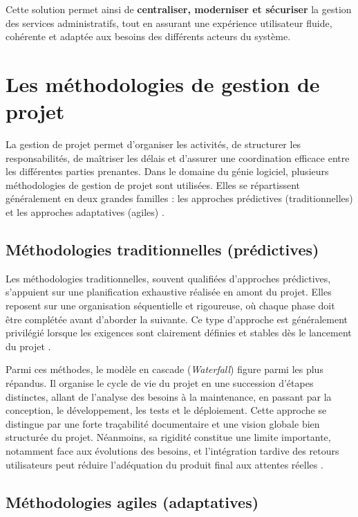 Cette solution permet ainsi de \textbf{centraliser, moderniser et sécuriser} la gestion des services administratifs, tout en assurant une expérience utilisateur fluide, cohérente et adaptée aux besoins des différents acteurs du système.


\section{Les méthodologies de gestion de projet}

La gestion de projet permet d’organiser les activités, de structurer les responsabilités, de maîtriser les délais et d’assurer une coordination efficace entre les différentes parties prenantes. Dans le domaine du génie logiciel, plusieurs méthodologies de gestion de projet sont utilisées. Elles se répartissent généralement en deux grandes familles : les approches prédictives (traditionnelles) et les approches adaptatives (agiles) \parencite{pmbok2017} .
 

\subsection{Méthodologies traditionnelles (prédictives)}

Les méthodologies traditionnelles, souvent qualifiées d’approches prédictives, s’appuient sur une planification exhaustive réalisée en amont du projet. Elles reposent sur une organisation séquentielle et rigoureuse, où chaque phase doit être complétée avant d’aborder la suivante. Ce type d’approche est généralement privilégié lorsque les exigences sont clairement définies et stables dès le lancement du projet \parencite{pressman2014}.

Parmi ces méthodes, le modèle en cascade (\textit{Waterfall}) figure parmi les plus répandus. Il organise le cycle de vie du projet en une succession d’étapes distinctes, allant de l’analyse des besoins à la maintenance, en passant par la conception, le développement, les tests et le déploiement. Cette approche se distingue par une forte traçabilité documentaire et une vision globale bien structurée du projet. Néanmoins, sa rigidité constitue une limite importante, notamment face aux évolutions des besoins, et l’intégration tardive des retours utilisateurs peut réduire l’adéquation du produit final aux attentes réelles \parencite{sommerville2016}.


\subsection{Méthodologies agiles (adaptatives)}

